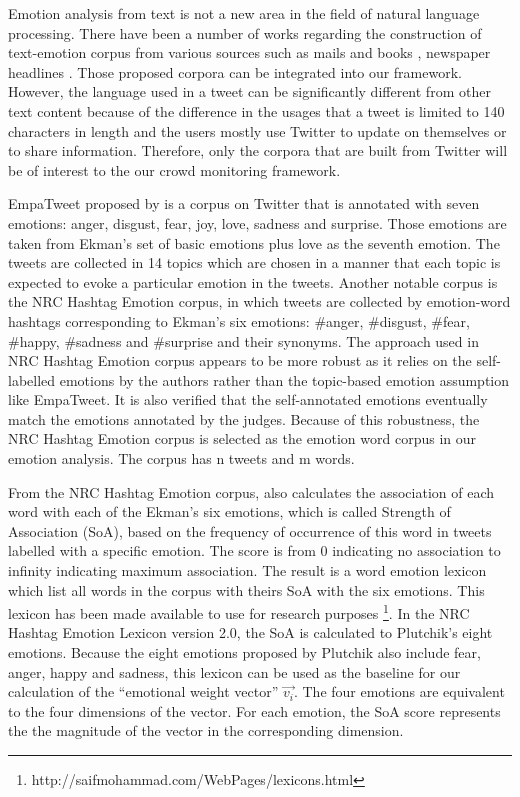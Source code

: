 Emotion analysis from text is not a new area in the field of natural language processing. There have been a number of works regarding the construction of text-emotion corpus from various sources such as mails \citep{mohammad2011tracking} and books \citep{mohammad2011once}, newspaper headlines \citep{strapparava2008learning}. Those proposed corpora can be integrated into our framework. However, the language used in a tweet can be significantly different from other text content because of the difference in the usages that a tweet is limited to 140 characters in length and the users mostly use Twitter to update on themselves or to share information. Therefore, only the corpora that are built from Twitter will be of interest to the our crowd monitoring framework.

EmpaTweet proposed by \citet{roberts2012empatweet} is a corpus on Twitter that is annotated with seven emotions: anger, disgust, fear, joy, love, sadness and surprise. Those emotions are taken from Ekman's set of basic emotions plus love as the seventh emotion. The tweets are collected in 14 topics which are chosen in a manner that each topic is expected to evoke a particular emotion in the tweets. Another notable corpus is the NRC Hashtag Emotion corpus, in which tweets are collected by emotion-word hashtags corresponding to Ekman's six emotions: \#anger, \#disgust, \#fear, \#happy, \#sadness and \#surprise and their synonyms\citep{mohammad2012emotional}. The approach used in NRC Hashtag Emotion corpus appears to be more robust as it relies on the self-labelled emotions by the authors rather than the topic-based emotion assumption like EmpaTweet. It is also verified that the self-annotated emotions eventually match the emotions annotated by the judges. Because of this robustness, the NRC Hashtag Emotion corpus is selected as the emotion word corpus in our emotion analysis. The corpus has n tweets and m words.

From the NRC Hashtag Emotion corpus, \citet{mohammad2012emotional} also calculates the association of each word with each of the Ekman's six emotions, which is called Strength of Association (SoA), based on the frequency of occurrence of this word in tweets labelled with a specific emotion. The score is from 0 indicating no association to infinity indicating maximum association. The result is a word emotion lexicon which list all words in the corpus with theirs SoA with the six emotions. This lexicon has been made available to use for research purposes \footnote{http://saifmohammad.com/WebPages/lexicons.html}. In the NRC Hashtag Emotion Lexicon version 2.0, the SoA is calculated to Plutchik's eight emotions. Because the eight emotions proposed by Plutchik also include fear, anger, happy and sadness, this lexicon can be used as the baseline for our calculation of the ``emotional weight vector'' \(\vec{v_i}\). The four emotions are equivalent to the four dimensions of the vector. For each emotion, the SoA score represents the the magnitude of the vector in the corresponding dimension.

